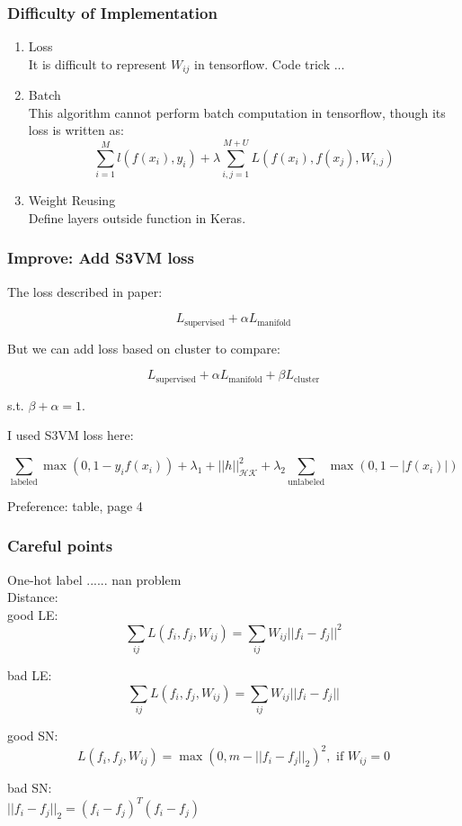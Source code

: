 \documentclass{beamer}
\begin{document}
\begin{frame}
\frametitle{Difficulty of Implementation}

\begin{enumerate}
\item Loss \\ 
It is difficult to represent $W_{ij}$ in tensorflow. Code trick ...
\item Batch  \\
This algorithm cannot perform batch computation in tensorflow, though its loss is written as:\\

$$ \sum_{i=1}^M l (f(x_i), y_i) + \lambda \sum_{i,j=1}^{M+U} L(f(x_i), f(x_j), W_{i,j}) $$

\item Weight Reusing\\
Define layers outside function in Keras.\\
\end{enumerate}

\end{frame}
\begin{frame}
\frametitle{Improve: Add S3VM loss}

The loss described in paper:

$$L_{\text{supervised}} + \alpha L_{\text{manifold}} $$ 

But we can add loss based on cluster to compare:

$$L_{\text{supervised}} + \alpha L_{\text{manifold}} + \beta L_{\text{cluster}}$$ 

s.t. $\beta +\alpha=1$.

I  used S3VM loss here:

$$ \sum_{\text{labeled}} \max(0, 1 - y_i f(x_i)) + \lambda_1 + ||h||^2_{\mathcal{HK}} + \lambda_2 \sum_{\text{unlabeled}}\max(0, 1 - |f(x_i)|)$$

Preference: table, page 4

\end{frame}
\begin{frame}
\frametitle{Careful points}

One-hot label ...... nan problem\\

Distance:\\

good LE:\\

$$ \sum_{ij} L(f_i, f_j, W_{ij}) = \sum_{ij} W_{ij} ||f_i - f_j||^2 $$


bad LE:\\

$$ \sum_{ij} L(f_i, f_j, W_{ij}) = \sum_{ij} W_{ij} ||f_i - f_j|| $$

good SN:\\

$$ L(f_i, f_j , W_{ij}) = \max(0, m- ||f_i - f_j||_2)^2,  \text{ if } W_{ij} = 0 $$

bad SN:\\

$||f_i - f_j||_2 = (f_i - f_j)^T(f_i - f_j)$


\end{frame}
\end{document}
